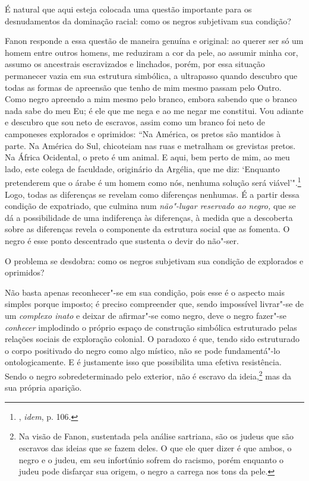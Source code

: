 É natural que aqui esteja colocada uma questão importante para os
desnudamentos da dominação racial: como os negros subjetivam sua
condição?

Fanon responde a essa questão de maneira genuína e original: ao querer
ser só um homem entre outros homens, me reduziram a cor da pele, ao
assumir minha cor, assumo os ancestrais escravizados e linchados, porém,
por essa situação permanecer vazia em sua estrutura simbólica, a
ultrapasso quando descubro que todas as formas de apreensão que tenho de
mim mesmo passam pelo Outro. Como negro apreendo a mim mesmo pelo
branco, embora sabendo que o branco nada sabe do meu Eu; é ele que me
nega e ao me negar me constitui. Vou adiante e descubro que sou neto de
escravos, assim como um branco foi neto de camponeses explorados e
oprimidos: ``Na América, os
pretos são mantidos à parte. Na América do Sul, chicoteiam nas ruas e
metralham os grevistas pretos. Na África Ocidental, o preto é um animal.
E aqui, bem perto de mim, ao meu lado, este colega de faculdade,
originário da Argélia, que me diz: `Enquanto pretenderem que o árabe é
um homem como nós, nenhuma solução será viável'".\footnote{, \emph{idem},
  p. 106.} Logo, todas as diferenças se revelam como diferenças
nenhumas. É a partir dessa condição de expatriado, que culmina num
\emph{não"-lugar reservado ao negro,} que se dá a possibilidade de uma
indiferença às diferenças, à medida que a descoberta sobre as diferenças
revela o componente da estrutura social que as fomenta. O negro é esse
ponto descentrado que sustenta o devir do não"-ser.

O problema se desdobra: como os negros subjetivam sua condição de
explorados e oprimidos?

Não basta apenas reconhecer"-se em sua condição, pois esse é o aspecto
mais simples porque imposto; é preciso compreender que, sendo impossível
livrar"-se de um \emph{complexo inato} e deixar de afirmar"-se como negro,
deve o negro fazer"-se \emph{conhecer} implodindo o próprio espaço de
construção simbólica estruturado pelas relações sociais de exploração
colonial. O paradoxo é que, tendo sido estruturado o corpo positivado do
negro como algo místico, não se pode fundamentá"-lo ontologicamente. E é
justamente isso que possibilita uma efetiva resistência. Sendo o negro
sobredeterminado pelo exterior, não é escravo da ideia,\footnote{Na visão
  de Fanon, sustentada pela análise sartriana, são os judeus que são
  escravos das ideias que se fazem deles. O que ele quer dizer é que
  ambos, o negro e o judeu, em seu infortúnio sofrem do racismo, porém
  enquanto o judeu pode disfarçar sua origem, o negro a carrega nos tons
  da pele.} mas da sua própria aparição.


